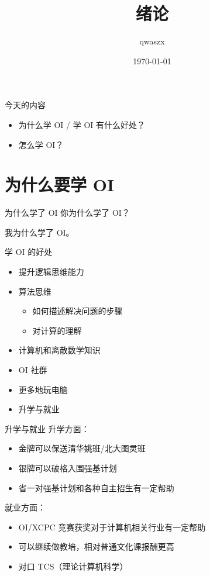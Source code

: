 \documentclass[11pt,aspectratio=169]{beamer}
\title{绪论}
\author{qwaszx}
\date{\today}
\begin{document}
\begin{frame}
  \titlepage
\end{frame}

\begin{frame}{今天的内容}
\begin{itemize}
    \item 为什么学 OI / 学 OI 有什么好处？
    \item 怎么学 OI？
\end{itemize}
\end{frame}

\section{为什么要学 OI}

\begin{frame}{为什么学了 OI}
    你为什么学了 OI？

    \pause
    我为什么学了 OI。
\end{frame}

\begin{frame}{学 OI 的好处}
\begin{itemize}
    \item 提升逻辑思维能力
    \item 算法思维
    \begin{itemize}
        \item 如何描述解决问题的步骤
        \item 对计算的理解
    \end{itemize}
    \item 计算机和离散数学知识
    \item OI 社群
    \item 更多地玩电脑
    \item 升学与就业
\end{itemize}
\end{frame}

\begin{frame}{升学与就业}
升学方面：
    \begin{itemize}
        \item 金牌可以保送清华姚班/北大图灵班
        \item 银牌可以破格入围强基计划
        \item 省一对强基计划和各种自主招生有一定帮助 
    \end{itemize}
就业方面：
    \begin{itemize}
        \item OI/XCPC 竞赛获奖对于计算机相关行业有一定帮助
        \item 可以继续做教培，相对普通文化课报酬更高
        \item 对口 TCS（理论计算机科学）
    \end{itemize}
\end{frame}
\end{document}
